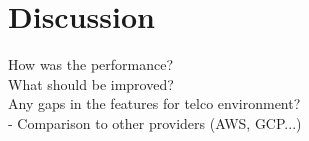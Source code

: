 \chapter{Discussion}
\label{chapter:discussion}

How was the performance? \\
What should be improved? \\
Any gaps in the features for telco environment? \\
- Comparison to other providers (AWS, GCP...) \\